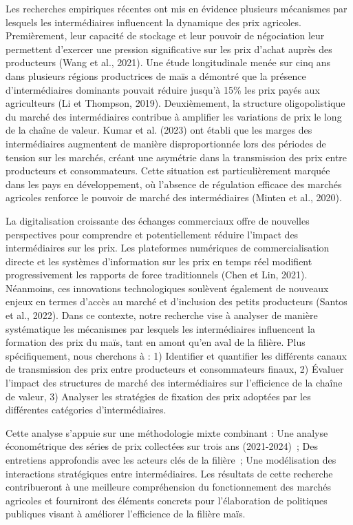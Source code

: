 \documentclass[12pt,oneside]{report}
\begin{document}
Les recherches empiriques récentes ont mis en évidence plusieurs mécanismes par lesquels les intermédiaires influencent la dynamique des prix agricoles. Premièrement, leur capacité de stockage et leur pouvoir de négociation leur permettent d'exercer une pression significative sur les prix d'achat auprès des producteurs (Wang et al., 2021). Une étude longitudinale menée sur cinq ans dans plusieurs régions productrices de maïs a démontré que la présence d'intermédiaires dominants pouvait réduire jusqu'à 15\% les prix payés aux agriculteurs (Li et Thompson, 2019). Deuxièmement, la structure oligopolistique du marché des intermédiaires contribue à amplifier les variations de prix le long de la chaîne de valeur. Kumar et al. (2023) ont établi que les marges des intermédiaires augmentent de manière disproportionnée lors des périodes de tension sur les marchés, créant une asymétrie dans la transmission des prix entre producteurs et consommateurs. Cette situation est particulièrement marquée dans les pays en développement, où l'absence de régulation efficace des marchés agricoles renforce le pouvoir de marché des intermédiaires (Minten et al., 2020).

La digitalisation croissante des échanges commerciaux offre de nouvelles perspectives pour comprendre et potentiellement réduire l'impact des intermédiaires sur les prix. Les plateformes numériques de commercialisation directe et les systèmes d'information sur les prix en temps réel modifient progressivement les rapports de force traditionnels (Chen et Lin, 2021). Néanmoins, ces innovations technologiques soulèvent également de nouveaux enjeux en termes d'accès au marché et d'inclusion des petits producteurs (Santos et al., 2022). Dans ce contexte, notre recherche vise à analyser de manière systématique les mécanismes par lesquels les intermédiaires influencent la formation des prix du maïs, tant en amont qu'en aval de la filière. Plus spécifiquement, nous cherchons à :  1) Identifier et quantifier les différents canaux de transmission des prix entre producteurs et consommateurs finaux, 2) Évaluer l'impact des structures de marché des intermédiaires sur l'efficience de la chaîne de valeur, 3) Analyser les stratégies de fixation des prix adoptées par les différentes catégories d'intermédiaires.

Cette analyse s'appuie sur une méthodologie mixte combinant : Une analyse économétrique des séries de prix collectées sur trois ans (2021-2024) ; Des entretiens approfondis avec les acteurs clés de la filière ; Une modélisation des interactions stratégiques entre intermédiaires. Les résultats de cette recherche contribueront à une meilleure compréhension du fonctionnement des marchés agricoles et fourniront des éléments concrets pour l'élaboration de politiques publiques visant à améliorer l'efficience de la filière maïs.
\end{document}
